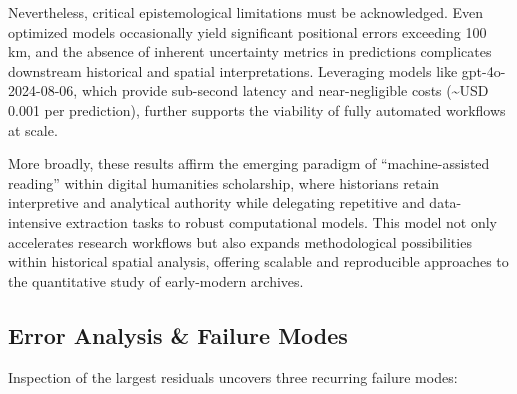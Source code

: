 Nevertheless, critical epistemological limitations must be acknowledged.
Even optimized models occasionally yield significant positional errors
exceeding 100 km, and the absence of inherent uncertainty metrics in
predictions complicates downstream historical and spatial
interpretations. Leveraging models like gpt-4o-2024-08-06, which provide
sub-second latency and near-negligible costs (\textasciitilde USD 0.001
per prediction), further supports the viability of fully automated
workflows at scale.

More broadly, these results affirm the emerging paradigm of
``machine-assisted reading'' within digital humanities scholarship,
where historians retain interpretive and analytical authority while
delegating repetitive and data-intensive extraction tasks to robust
computational models. This model not only accelerates research workflows
but also expands methodological possibilities within historical spatial
analysis, offering scalable and reproducible approaches to the
quantitative study of early-modern archives.

\subsection{Error Analysis \& Failure
Modes}\label{error-analysis-failure-modes}

Inspection of the largest residuals uncovers three recurring failure
modes:

